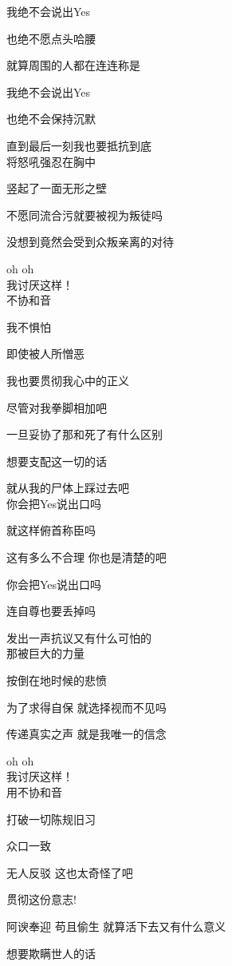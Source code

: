 我绝不会说出Yes

也绝不愿点头哈腰

就算周围的人都在连连称是

我绝不会说出Yes

也绝不会保持沉默

直到最后一刻我也要抵抗到底
\\

将怒吼强忍在胸中

竖起了一面无形之壁

不愿同流合污就要被视为叛徒吗

没想到竟然会受到众叛亲离的对待

oh oh
\\

我讨厌这样！
\\

不协和音

我不惧怕

即使被人所憎恶

我也要贯彻我心中的正义

尽管对我拳脚相加吧

一旦妥协了那和死了有什么区别

想要支配这一切的话

就从我的尸体上踩过去吧
\\

你会把Yes说出口吗

就这样俯首称臣吗

这有多么不合理 你也是清楚的吧

你会把Yes说出口吗

连自尊也要丢掉吗

发出一声抗议又有什么可怕的
\\

那被巨大的力量

按倒在地时候的悲愤

为了求得自保 就选择视而不见吗

传递真实之声 就是我唯一的信念

oh oh
\\

我讨厌这样！
\\

用不协和音

打破一切陈规旧习

众口一致

无人反驳 这也太奇怪了吧

贯彻这份意志!

阿谀奉迎 苟且偷生 就算活下去又有什么意义

想要欺瞒世人的话

